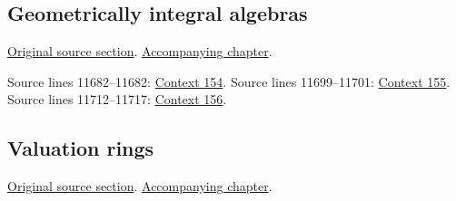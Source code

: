 \subsection{Geometrically integral algebras}
\hypertarget{algebra-source-section-geometrically-integral}{}
\noindent\href{https://github.com/stacks/stacks-project/blob/a04446e57ec1fbc252a871afcec7752fb2807b14/algebra.tex\#L11654}{Original source section}. \href{algebra.pdf\#nameddest=section-geometrically-integral}{Accompanying chapter}.

\begin{AlgebraSourceRoutes}
 Source lines 11682--11682: \hyperlink{algebra-context-154}{Context 154}.
 Source lines 11699--11701: \hyperlink{algebra-context-155}{Context 155}.
 Source lines 11712--11717: \hyperlink{algebra-context-156}{Context 156}.
\end{AlgebraSourceRoutes}

\subsection{Valuation rings}
\hypertarget{algebra-source-section-valuation-rings}{}
\noindent\href{https://github.com/stacks/stacks-project/blob/a04446e57ec1fbc252a871afcec7752fb2807b14/algebra.tex\#L11723}{Original source section}. \href{algebra.pdf\#nameddest=section-valuation-rings}{Accompanying chapter}.

